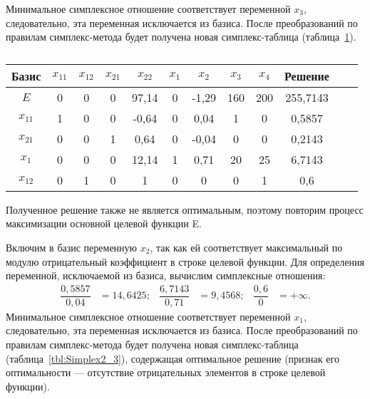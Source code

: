 Минимальное симплексное отношение соответствует переменной $ x_{3} $,
следовательно, эта переменная исключается из базиса.
После преобразований по правилам симплекс-метода
будет получена новая симплекс-таблица (таблица~\ref{tbl:Simplex2_2}).

\renewcommand{\tabcolsep}{0.7em}
\begin{table}[h]
  \centering
    \caption{\label{tbl:Simplex2_2}}
    \begin{tabular}{|c|c|c|c|c|c|c|c|c|c|c|c|}
      \hline
      Базис & $ x_{11} $ & $ x_{12} $ & $ x_{21} $ & $ x_{22} $ & $ x_{1} $ & $ x_{2} $ & $ x_{3} $ & $ x_{4} $ & Решение \\  
      \hline
      $ E $ & 0 & 0 & 0 & 97{,}14 & 0 & -1{,}29 & 160 & 200 & 255{,}7143 \\  
      \hline
      $ x_{11} $ & 1 & 0 & 0 & -0{,}64 & 0 & 0{,}04 & 1 & 0 & 0{,}5857 \\  
      \hline
      $ x_{21} $ & 0 & 0 & 1 & 0{,}64 & 0 & -0{,}04 & 0 & 0 & 0{,}2143 \\  
      \hline
      $ x_{1} $ & 0 & 0 & 0 & 12{,}14 & 1 & 0{,}71 & 20 & 25 & 6{,}7143 \\  
      \hline
      $ x_{12} $ & 0 & 1 & 0 & 1 & 0 & 0 & 0 & 1 & 0{,}6 \\  
      \hline
    \end{tabular}
\end{table}

Полученное решение также не является оптимальным, поэтому повторим процесс 
максимизации основной целевой функции E.

Включим в базис переменную $ x_{2} $, так как ей соответствует
максимальный по модулю отрицательный коэффициент в строке целевой
функции. Для определения переменной, исключаемой из базиса, вычислим
симплексные отношения:
\begin{align}
  \dfrac{0{,}5857}{0{,}04} & = 14{,}6425; &
  \dfrac{6{,}7143}{0{,}71} & = 9{,}4568; &
  \dfrac{0{,}6}{0} & = +\infty.
\end{align}
Минимальное симплексное отношение соответствует переменной $ x_{1} $,
следовательно, эта переменная исключается из базиса.
После преобразований по правилам симплекс-метода
будет получена новая симплекс-таблица (таблица~\ref{tbl:Simplex2_3}),
содержащая оптимальное решение (признак его оптимальности --- отсутствие
отрицательных элементов в строке целевой функции).

